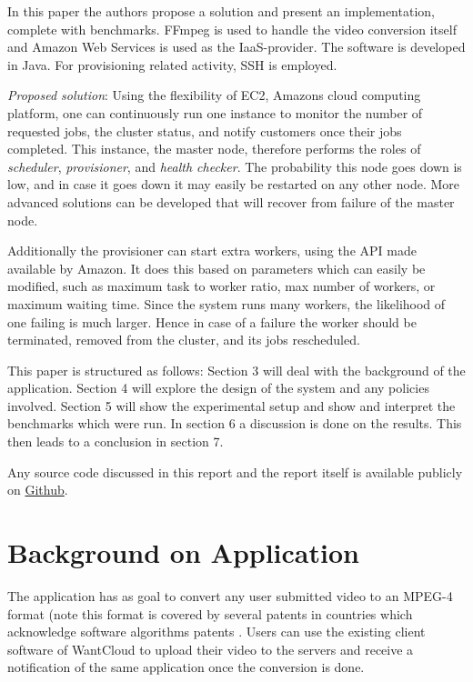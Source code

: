 \documentclass[a4paper]{IEEEtran}
\begin{document}
In this paper the authors propose a solution and present an implementation, complete with benchmarks.
FFmpeg is used to handle the video conversion itself and Amazon Web Services is used as the IaaS-provider.
The software is developed in Java. For provisioning related activity, SSH is employed.

\textit{Proposed solution}: Using the flexibility of EC2, Amazons cloud computing platform, one can continuously run one instance to monitor the number of requested jobs, the cluster status, and notify customers once their jobs completed.
This instance, the master node, therefore performs the roles of \textit{scheduler}, \textit{provisioner}, and \textit{health checker}.
The probability this node goes down is low, and in case it goes down it may easily be restarted on any other node.
More advanced solutions can be developed that will recover from failure of the master node.

Additionally the provisioner can start extra workers, using the API made available by Amazon.
It does this based on parameters which can easily be modified, such as maximum task to worker ratio, max number of workers, or maximum waiting time.
Since the system runs many workers, the likelihood of one failing is much larger. 
Hence in case of a failure the worker should be terminated, removed from the cluster, and its jobs rescheduled.

This paper is structured as follows:
Section 3 will deal with the background of the application.
Section 4 will explore the design of the system and any policies involved. 
Section 5 will show the experimental setup and show and interpret the benchmarks which were run.
In section 6 a discussion is done on the results.
This then leads to a conclusion in section 7.

Any source code discussed in this report and the report itself is available publicly on \href{https://github.com/snorberhuis/CloudComputing}{Github}.

\section{Background on Application}

The application has as goal to convert any user submitted video to an MPEG-4 format (note this format is covered by several patents in countries which acknowledge software algorithms patents \cite{mpegla}.
Users can use the existing client software of WantCloud to upload their video to the servers and receive a notification of the same application once the conversion is done.
\end{document}
